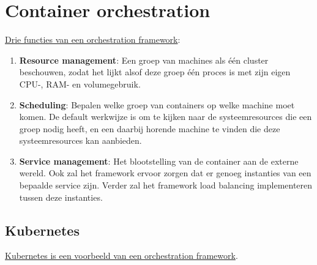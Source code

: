 	\chapter{Container orchestration}
	\underline{Drie functies van een orchestration framework}:
	\begin{enumerate}
		\item \textbf{Resource management}: Een groep van machines als één cluster beschouwen, zodat het lijkt alsof deze groep één proces is met zijn eigen CPU-, RAM- en volumegebruik.
		\item \textbf{Scheduling}: Bepalen welke groep van containers op welke machine moet komen. De default werkwijze is om te kijken naar de systeemresources die een groep nodig heeft, en een daarbij horende machine te vinden die deze systeemresources kan aanbieden.
		\item \textbf{Service management}: Het blootstelling van de container aan de externe wereld. Ook zal het framework ervoor zorgen dat er genoeg instanties van een bepaalde service zijn. Verder zal het framework load balancing implementeren tussen deze instanties.
	\end{enumerate}

	\section{Kubernetes}
	\underline{Kubernetes is een voorbeeld van een orchestration framework}.

